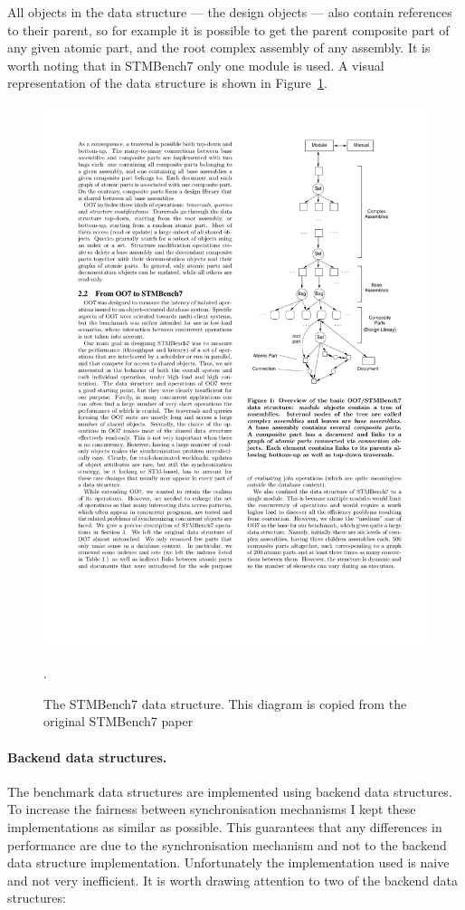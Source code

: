 \documentclass[12pt,a4paper,oneside,openright]{report}
\newcommand{\mycaption}[2]{\caption[#1]{#1 #2}}
\begin{document}
All objects in the data structure --- the design objects --- also
contain references to their parent, so for example it is possible to
get the parent composite part of any given atomic part, and the root
complex assembly of any assembly. It is worth noting that in STMBench7
only one module is used. A visual representation of the data structure
is shown in Figure~\ref{fig:stmbench7}.

\begin{figure}[h]
  \centering \includegraphics{stmbench7.pdf} \mycaption{The STMBench7
    data structure.}{This diagram is copied from the original
    STMBench7 paper~\cite{STMBench7}}.
  \label{fig:stmbench7}
\end{figure}

\paragraph{Backend data structures.} The benchmark data structures are
implemented using backend data structures. To increase the fairness
between synchronisation mechanisms I kept these implementations as
similar as possible. This guarantees that any differences in
performance are due to the synchronisation mechanism and not to the
backend data structure implementation. Unfortunately the
implementation used is naive and not very inefficient. It is worth
drawing attention to two of the backend data structures:
\end{document}
